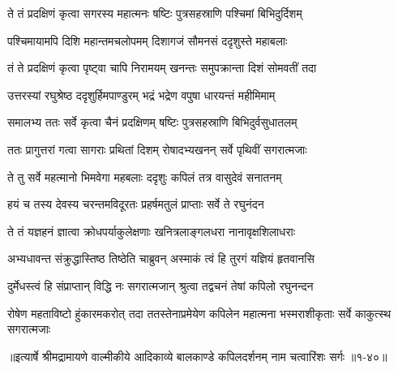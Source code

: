 \twolineshloka
{ते तं प्रदक्षिणं कृत्वा सगरस्य महात्मनः}
{षष्टिः पुत्रसहस्राणि पश्चिमां बिभिदुर्दिशम्} %

\twolineshloka
{पश्चिमायामपि दिशि महान्तमचलोपमम्}
{दिशागजं सौमनसं ददृशुस्ते महाबलाः} %

\twolineshloka
{तं ते प्रदक्षिणं कृत्वा पृष्ट्वा चापि निरामयम्}
{खनन्तः समुपक्रान्ता दिशं सोमवतीं तदा} %

\twolineshloka
{उत्तरस्यां रघुश्रेष्ठ ददृशुर्हिमपाण्डुरम्}
{भद्रं भद्रेण वपुषा धारयन्तं महीमिमाम्} %

\twolineshloka
{समालभ्य ततः सर्वे कृत्वा चैनं प्रदक्षिणम्}
{षष्टिः पुत्रसहस्राणि बिभिदुर्वसुधातलम्} %

\twolineshloka
{ततः प्रागुत्तरां गत्वा सागराः प्रथितां दिशम्}
{रोषादभ्यखनन् सर्वे पृथिवीं सगरात्मजाः} %

\twolineshloka
{ते तु सर्वे महत्मानो भिमवेगा महबलाः}
{ददृशुः कपिलं तत्र वासुदेवं सनातनम्} %

\twolineshloka
{हयं च तस्य देवस्य चरन्तमविदूरतः}
{प्रहर्षमतुलं प्राप्ताः सर्वे ते रघुनंदन} %

\twolineshloka
{ते तं यज्ञहनं ज्ञात्वा क्रोधपर्याकुलेक्षणाः}
{खनित्रलाङ्गलधरा नानावृक्षशिलाधराः} %

\twolineshloka
{अभ्यधावन्त संक्रुद्धास्तिष्ठ तिष्ठेति चाब्रुवन्}
{अस्माकं त्वं हि तुरगं यज्ञियं हृतवानसि} %

\twolineshloka
{दुर्मेधस्त्वं हि संप्राप्तान् विद्धि नः सगरात्मजान्}
{श्रुत्वा तद्वचनं तेषां कपिलो रघुनन्दन} %

\threelineshloka
{रोषेण महताविष्टो हुंकारमकरोत् तदा}
{ततस्तेनाप्रमेयेण कपिलेन महात्मना}
{भस्मराशीकृताः सर्वे काकुत्स्थ सगरात्मजाः} %


॥इत्यार्षे श्रीमद्रामायणे वाल्मीकीये आदिकाव्ये बालकाण्डे कपिलदर्शनम् नाम चत्वारिंशः सर्गः ॥१-४०॥
